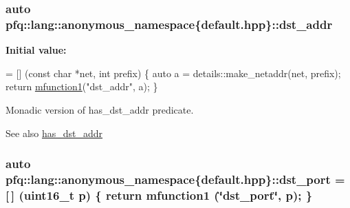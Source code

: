 \hypertarget{namespacepfq_1_1lang_1_1anonymous__namespace_02default_8hpp_03_a3f51de44baa33ff19a94995945636072}{
\subsubsection[{dst\+\_\+addr}]{\setlength{\rightskip}{0pt plus 5cm}auto pfq\+::lang\+::anonymous\+\_\+namespace\{default.\+hpp\}\+::dst\+\_\+addr}}\label{namespacepfq_1_1lang_1_1anonymous__namespace_02default_8hpp_03_a3f51de44baa33ff19a94995945636072}
{\bfseries Initial value\+:}
\begin{DoxyCode}
= [] (\textcolor{keyword}{const} \textcolor{keywordtype}{char} *net, \textcolor{keywordtype}{int} prefix)
        \{
            \textcolor{keyword}{auto} a = details::make\_netaddr(net, prefix);
            \textcolor{keywordflow}{return} \hyperlink{namespacepfq_1_1lang_a68d775c68562fbd0ab9ef213f2519499}{mfunction1}(\textcolor{stringliteral}{"dst\_addr"}, a);
        \}
\end{DoxyCode}


Monadic version of {\ttfamily has\+\_\+dst\+\_\+addr} predicate. 

\begin{DoxySeeAlso}{See also}
\hyperlink{namespacepfq_1_1lang_1_1anonymous__namespace_02default_8hpp_03_a0a53822af0ed8ea341f16a1da5ea83e3}{has\+\_\+dst\+\_\+addr} 
\end{DoxySeeAlso}
\hypertarget{namespacepfq_1_1lang_1_1anonymous__namespace_02default_8hpp_03_a25a3b35caf255c109a6c5b4f601b1b61}{
\subsubsection[{dst\+\_\+port}]{\setlength{\rightskip}{0pt plus 5cm}auto pfq\+::lang\+::anonymous\+\_\+namespace\{default.\+hpp\}\+::dst\+\_\+port = \mbox{[}$\,$\mbox{]} (uint16\+\_\+t p) \{ return {\bf mfunction1} (\char`\"{}dst\+\_\+port\char`\"{}, p); \}}}\label{namespacepfq_1_1lang_1_1anonymous__namespace_02default_8hpp_03_a25a3b35caf255c109a6c5b4f601b1b61}


